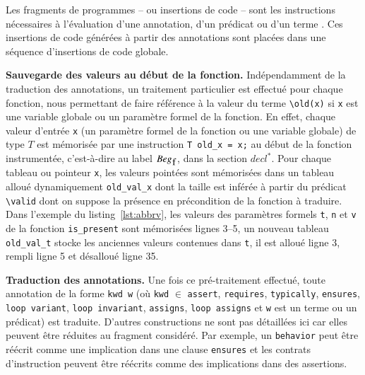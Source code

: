 Les fragments de programmes -- ou insertions de code -- sont les instructions
nécessaires à l'évaluation d'une annotation, d'un prédicat ou d'un terme
\eacsl.
Ces insertions de code générées à partir des annotations sont placées
dans une séquence d'insertions de code globale.

\textbf{Sauvegarde des valeurs  au début de la fonction.}
Indépendamment de la traduction des annotations, un traitement particulier est
effectué pour chaque fonction, nous permettant de faire référence à la valeur
du terme \lstinline'\old(x)' si \lstinline'x' est une variable globale ou un
paramètre formel de la fonction.
En effet, chaque valeur d'entrée \lstinline'x' (un paramètre formel de la
fonction ou une variable globale) de type $T$ est mémorisée par
une instruction \lstinline|T old_x = x;| au début de la fonction
instrumentée, c'est-à-dire au label $Beg_{\mbox{\lstinline'f'}}$, dans la section
$decl^{*}$.
Pour chaque tableau ou pointeur \lstinline'x', les valeurs pointées sont
mémorisées dans un tableau alloué dynamiquement \lstinline'old_val_x' dont la
taille est inférée à partir du prédicat \lstinline'\valid' dont on suppose la
présence en précondition de la fonction à traduire.
Dans l'exemple du listing~\ref{lst:abbrv}, les valeurs des paramètres formels
\lstinline|t|, \lstinline|n| et \lstinline|v| de la fonction
\lstinline'is_present' sont mémorisées lignes 3--5, un
nouveau tableau \lstinline|old_val_t| stocke les anciennes valeurs contenues
dans \lstinline|t|, il est alloué ligne 3, rempli ligne 5 et désalloué ligne 35.

\textbf{Traduction des annotations.}
Une fois ce pré-traitement effectué, toute annotation \eacsl de la forme
\lstinline'kwd w' (où \lstinline'kwd' $\in$ \bopen \lstinline|assert|,
\lstinline|requires|, \lstinline|typically|, \lstinline|ensures|,
\lstinline|loop variant|, \lstinline|loop invariant|, \lstinline|assigns|,
\lstinline|loop assigns| \bclose et \lstinline'w' est un terme ou un prédicat)
est traduite.
D'autres constructions \eacsl ne sont pas détaillées ici car elles peuvent être
réduites au fragment \eacsl considéré.
Par exemple, un \lstinline'behavior' peut être réécrit comme une implication
dans une clause \lstinline'ensures' et les contrats d'instruction peuvent être
réécrits comme des implications dans des assertions.





